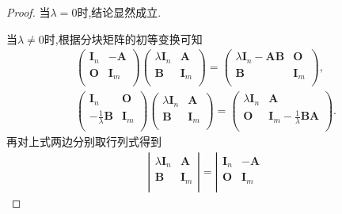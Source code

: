 \documentclass[../../main.tex]{subfiles}%
\begin{document}
\begin{proof}
当$\lambda=0$时,结论显然成立.

当$\lambda\ne 0$时,根据分块矩阵的初等变换可知
\begin{gather*}
\left( \begin{matrix}
\boldsymbol{I}_n&		-\boldsymbol{A}\\
\boldsymbol{O}&		\boldsymbol{I}_m\\
\end{matrix} \right) \left( \begin{matrix}
\lambda \boldsymbol{I}_n&		\boldsymbol{A}\\
\boldsymbol{B}&		\boldsymbol{I}_m\\
\end{matrix} \right) =\left( \begin{matrix}
\lambda \boldsymbol{I}_n-\boldsymbol{AB}&		\boldsymbol{O}\\
\boldsymbol{B}&		\boldsymbol{I}_m\\
\end{matrix} \right) ,
\\
\left( \begin{matrix}
\boldsymbol{I}_n&		\boldsymbol{O}\\
-\frac{1}{\lambda}\boldsymbol{B}&		\boldsymbol{I}_m\\
\end{matrix} \right) \left( \begin{matrix}
\lambda \boldsymbol{I}_n&		\boldsymbol{A}\\
\boldsymbol{B}&		\boldsymbol{I}_m\\
\end{matrix} \right) =\left( \begin{matrix}
\lambda \boldsymbol{I}_n&		\boldsymbol{A}\\
\boldsymbol{O}&		\boldsymbol{I}_m-\frac{1}{\lambda}\boldsymbol{BA}\\
\end{matrix} \right) .
\end{gather*}
再对上式两边分别取行列式得到
\begin{gather*}
\left| \begin{matrix}
\lambda \boldsymbol{I}_n&		\boldsymbol{A}\\
\boldsymbol{B}&		\boldsymbol{I}_m\\
\end{matrix} \right|=\left| \begin{matrix}
\boldsymbol{I}_n&		-\boldsymbol{A}\\
\boldsymbol{O}&		\boldsymbol{I}_m\\

\end{matrix}
\end{gather*}
\end{proof}
\end{document}
